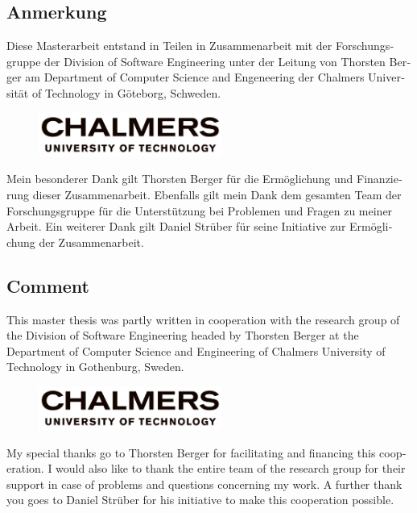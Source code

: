 
\begin{otherlanguage}{ngerman}
    \section*{Anmerkung}

Diese Masterarbeit entstand in Teilen in Zusammenarbeit mit der Forschungsgruppe der Division of Software Engineering unter der Leitung von Thorsten Berger am Department of Computer Science and Engeneering der Chalmers Universität of Technology in Göteborg, Schweden.

\begin{figure}[H]
    \centering
    \includegraphics[width=6cm]{logos/chalmers}
\label{fig:chalmers}
\end{figure}

Mein besonderer Dank gilt Thorsten Berger für die Ermöglichung und Finanzierung dieser Zusammenarbeit. Ebenfalls gilt mein Dank dem gesamten Team der Forschungsgruppe für die Unterstützung bei Problemen und Fragen zu meiner Arbeit. Ein weiterer Dank gilt Daniel Strüber für seine Initiative zur Ermöglichung der Zusammenarbeit.

\end{otherlanguage}

\begin{otherlanguage}{english}
    \section*{Comment}

This master thesis was partly written in cooperation with the research group of the Division of Software Engineering headed by Thorsten Berger at the Department of Computer Science and Engineering of Chalmers University of Technology in Gothenburg, Sweden.

\begin{figure}[H]
    \centering
    \includegraphics[width=6cm]{logos/chalmers}
\label{fig:chalmers}
\end{figure}

My special thanks go to Thorsten Berger for facilitating and financing this cooperation. I would also like to thank the entire team of the research group for their support in case of problems and questions concerning my work. A further thank you goes to Daniel Strüber for his initiative to make this cooperation possible.

\end{otherlanguage}
\cleardoublepage